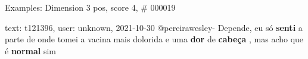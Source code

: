 \begin{frame}{Examples: Dimension 3 pos, score 4, \# 000019}
\footnotesize
\begin{exampleblock}{text: t121396, user: unknown, 2021-10-30}
@pereirawesley- Depende, eu só \textbf{senti} a parte de onde tomei a vacina 
mais dolorida e uma \textbf{dor} de \textbf{cabeça} , mas acho que é 
\textbf{normal} sim 
\end{exampleblock}
\end{frame}
